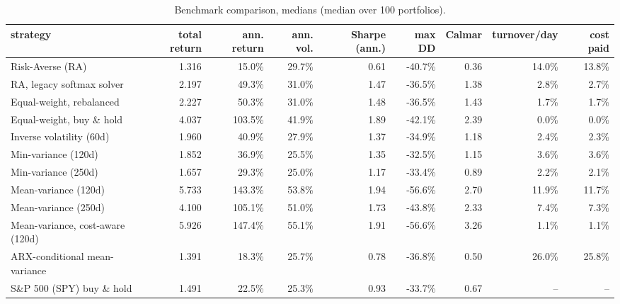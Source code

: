 \begin{table}[ht!]
\centering
\footnotesize
\setlength{\tabcolsep}{4pt}
\begin{tabular}{lrrrrrrrr}
\hline
strategy & total return & ann. return & ann. vol. & Sharpe (ann.) & max DD & Calmar & turnover/day & cost paid \\
\hline
Risk-Averse (RA) & 1.316 & 15.0\% & 29.7\% & 0.61 & -40.7\% & 0.36 & 14.0\% & 13.8\% \\
RA, legacy softmax solver & 2.197 & 49.3\% & 31.0\% & 1.47 & -36.5\% & 1.38 & 2.8\% & 2.7\% \\
Equal-weight, rebalanced & 2.227 & 50.3\% & 31.0\% & 1.48 & -36.5\% & 1.43 & 1.7\% & 1.7\% \\
Equal-weight, buy \& hold & 4.037 & 103.5\% & 41.9\% & 1.89 & -42.1\% & 2.39 & 0.0\% & 0.0\% \\
Inverse volatility (60d) & 1.960 & 40.9\% & 27.9\% & 1.37 & -34.9\% & 1.18 & 2.4\% & 2.3\% \\
Min-variance (120d) & 1.852 & 36.9\% & 25.5\% & 1.35 & -32.5\% & 1.15 & 3.6\% & 3.6\% \\
Min-variance (250d) & 1.657 & 29.3\% & 25.0\% & 1.17 & -33.4\% & 0.89 & 2.2\% & 2.1\% \\
Mean-variance (120d) & 5.733 & 143.3\% & 53.8\% & 1.94 & -56.6\% & 2.70 & 11.9\% & 11.7\% \\
Mean-variance (250d) & 4.100 & 105.1\% & 51.0\% & 1.73 & -43.8\% & 2.33 & 7.4\% & 7.3\% \\
Mean-variance, cost-aware (120d) & 5.926 & 147.4\% & 55.1\% & 1.91 & -56.6\% & 3.26 & 1.1\% & 1.1\% \\
ARX-conditional mean-variance & 1.391 & 18.3\% & 25.7\% & 0.78 & -36.8\% & 0.50 & 26.0\% & 25.8\% \\
S\&P 500 (SPY) buy \& hold & 1.491 & 22.5\% & 25.3\% & 0.93 & -33.7\% & 0.67 & -- & -- \\
\hline
\end{tabular}
\caption{Benchmark comparison, medians (median over 100 portfolios).}
\label{tab:bench_median_covid}
\end{table}
